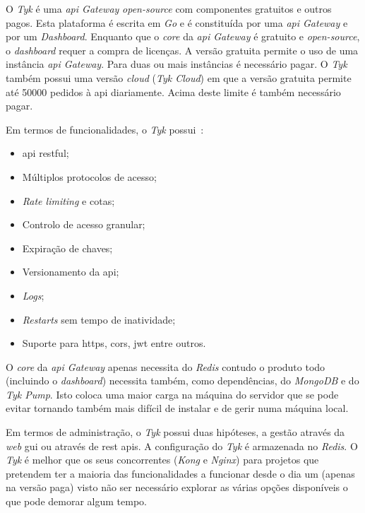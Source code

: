 O \textit{Tyk} é uma \textit{\acrshort{api} Gateway} \textit{open-source} com componentes gratuitos e outros pagos. Esta plataforma é escrita em \textit{Go} e é constituída por uma \textit{\acrshort{api} Gateway} e por um \textit{Dashboard}. Enquanto que o \textit{core} da \textit{\acrshort{api} Gateway} é gratuito e \textit{open-source}, o \textit{dashboard} requer a compra de licenças. A versão gratuita permite o uso de uma instância \textit{\acrshort{api} Gateway}. Para duas ou mais instâncias é necessário pagar. O \textit{Tyk} também possui uma versão \textit{cloud} (\textit{Tyk Cloud}) em que a versão gratuita permite até 50000 pedidos à \acrshort{api} diariamente. Acima deste limite é também necessário pagar.

Em termos de funcionalidades, o \textit{Tyk} possui~\cite{tyk}:
\begin{itemize}
    \item \acrshort{api} \acrshort{rest}ful;
    \item Múltiplos protocolos de acesso;
    \item \textit{Rate limiting} e cotas;
    \item Controlo de acesso granular;
    \item Expiração de chaves;
    \item Versionamento da \acrshort{api};
    \item \textit{Logs};
    \item \textit{Restarts} sem tempo de inatividade;
    \item Suporte para \acrshort{https}, \acrshort{cors}, \acrshort{jwt} entre outros.
\end{itemize}

O \textit{core} da \textit{\acrshort{api} Gateway} apenas necessita do \textit{Redis} contudo o produto todo (incluindo o \textit{dashboard}) necessita também, como dependências, do \textit{MongoDB} e do \textit{Tyk Pump}. 
Isto coloca uma maior carga na máquina do servidor que se pode evitar tornando também mais difícil de instalar e de gerir numa máquina local.

Em termos de administração, o \textit{Tyk} possui duas hipóteses, a gestão através da \textit{web} \acrshort{gui} ou através de \acrshort{rest} \acrshort{api}s. A configuração do \textit{Tyk} é armazenada no \textit{Redis}. O \textit{Tyk} é melhor que os seus concorrentes (\textit{Kong} e \textit{Nginx}) para projetos que pretendem ter a maioria das funcionalidades a funcionar desde o dia um (apenas na versão paga) visto não ser necessário explorar as várias opções disponíveis o que pode demorar algum tempo.~\cite{compAPIGat}

